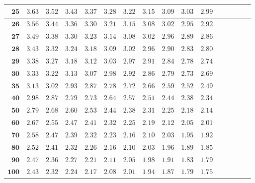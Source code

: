 \begin{alternateColorTable}
\begin{longtable}{|r|r|r|r|r|r|r|r|r|r|r|r|r|r|r|r|}
    \(\mathbf{25}\) & \(3.63\)  & \(3.52\)  & \(3.43\)  & \(3.37\)  & \(3.28\)  & \(3.22\)  & \(3.15\)  & \(3.09\)  & \(3.03\)  & \(2.99\) \\ \hline 
    \(\mathbf{26}\) & \(3.56\)  & \(3.44\)  & \(3.36\)  & \(3.30\)  & \(3.21\)  & \(3.15\)  & \(3.08\)  & \(3.02\)  & \(2.95\)  & \(2.92\) \\ \hline 
    \(\mathbf{27}\) & \(3.49\)  & \(3.38\)  & \(3.30\)  & \(3.23\)  & \(3.14\)  & \(3.08\)  & \(3.02\)  & \(2.96\)  & \(2.89\)  & \(2.86\) \\ \hline 
    \(\mathbf{28}\) & \(3.43\)  & \(3.32\)  & \(3.24\)  & \(3.18\)  & \(3.09\)  & \(3.02\)  & \(2.96\)  & \(2.90\)  & \(2.83\)  & \(2.80\) \\ \hline 
    \(\mathbf{29}\) & \(3.38\)  & \(3.27\)  & \(3.18\)  & \(3.12\)  & \(3.03\)  & \(2.97\)  & \(2.91\)  & \(2.84\)  & \(2.78\)  & \(2.74\) \\ \hline 
    \(\mathbf{30}\) & \(3.33\)  & \(3.22\)  & \(3.13\)  & \(3.07\)  & \(2.98\)  & \(2.92\)  & \(2.86\)  & \(2.79\)  & \(2.73\)  & \(2.69\) \\ \hline 
    \(\mathbf{35}\) & \(3.13\)  & \(3.02\)  & \(2.93\)  & \(2.87\)  & \(2.78\)  & \(2.72\)  & \(2.66\)  & \(2.59\)  & \(2.52\)  & \(2.49\) \\ \hline 
    \(\mathbf{40}\) & \(2.98\)  & \(2.87\)  & \(2.79\)  & \(2.73\)  & \(2.64\)  & \(2.57\)  & \(2.51\)  & \(2.44\)  & \(2.38\)  & \(2.34\) \\ \hline 
    \(\mathbf{50}\) & \(2.79\)  & \(2.68\)  & \(2.60\)  & \(2.53\)  & \(2.44\)  & \(2.38\)  & \(2.31\)  & \(2.25\)  & \(2.18\)  & \(2.14\) \\ \hline 
    \(\mathbf{60}\) & \(2.67\)  & \(2.55\)  & \(2.47\)  & \(2.41\)  & \(2.32\)  & \(2.25\)  & \(2.19\)  & \(2.12\)  & \(2.05\)  & \(2.01\) \\ \hline 
    \(\mathbf{70}\) & \(2.58\)  & \(2.47\)  & \(2.39\)  & \(2.32\)  & \(2.23\)  & \(2.16\)  & \(2.10\)  & \(2.03\)  & \(1.95\)  & \(1.92\) \\ \hline 
    \(\mathbf{80}\) & \(2.52\)  & \(2.41\)  & \(2.32\)  & \(2.26\)  & \(2.16\)  & \(2.10\)  & \(2.03\)  & \(1.96\)  & \(1.89\)  & \(1.85\) \\ \hline 
    \(\mathbf{90}\) & \(2.47\)  & \(2.36\)  & \(2.27\)  & \(2.21\)  & \(2.11\)  & \(2.05\)  & \(1.98\)  & \(1.91\)  & \(1.83\)  & \(1.79\) \\ \hline 
    \(\mathbf{100}\) & \(2.43\)  & \(2.32\)  & \(2.24\)  & \(2.17\)  & \(2.08\)  & \(2.01\)  & \(1.94\)  & \(1.87\)  & \(1.79\)  & \(1.75\) \\ \hline 

\end{longtable}
\end{alternateColorTable}
